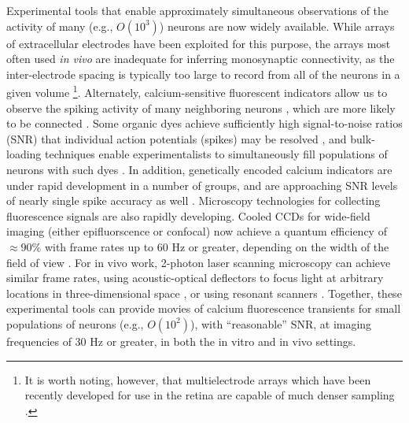 Experimental tools that enable approximately simultaneous observations of the activity of many (e.g., $O(10^3)$) neurons are now widely available. While arrays of extracellular electrodes have been exploited for this purpose, the arrays most often used \emph{in vivo} are inadequate for inferring monosynaptic connectivity, as the inter-electrode spacing is typically too large to record from all of the neurons in a given volume \cite{HATS98,HARR03,Stein04,Santhanam06,Harris07} \footnote{It is worth noting, however, that multielectrode arrays which have been recently developed for use in the retina are capable of much denser sampling \cite{Berry2004,Litke2004,Petrusca07,PILL07}.}. Alternately, calcium-sensitive fluorescent indicators allow us to observe the spiking activity of many neighboring neurons \cite{Tsien89}, which are more likely to be connected \cite{Abeles91,Braitenberg1998}. Some organic dyes achieve sufficiently high signal-to-noise ratios (SNR) that individual action potentials (spikes) may be resolved \cite{ImagingManual}, and bulk-loading techniques enable experimentalists to simultaneously fill populations of neurons with such dyes \cite{StosiekKonnerth03}. In addition, genetically encoded calcium indicators are under rapid development in a number of groups, and are approaching SNR levels of nearly single spike accuracy as well \cite{WallaceHasan08}. Microscopy technologies for collecting fluorescence signals are also rapidly developing. Cooled CCDs for wide-field imaging (either epifluorscence or confocal) now achieve a quantum efficiency of $\approx 90 \%$ with frame rates up to $60$ Hz or greater, depending on the width of the field of view \cite{Djurisic04}. For in vivo work, 2-photon laser scanning microscopy can achieve similar frame rates, using acoustic-optical deflectors to focus light at arbitrary locations in three-dimensional space \cite{ReddySaggau05,Iyer06,SalomeBourdieu06,ReddySaggau08}, or using resonant scanners \cite{NguyenParker01}. Together, these experimental tools can provide movies of calcium fluorescence transients for small populations of neurons (e.g., $O(10^2)$), with ``reasonable'' SNR, at imaging frequencies of 30 Hz or greater, in both the in vitro and in vivo settings.

